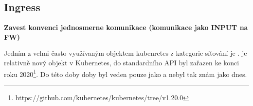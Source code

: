 
\subsection{Ingress}
\textbf{Zavest konvenci jednosmerne komunikace (komunikace jako INPUT na FW)}

Jedním z velmi často využívaným objektem kubenretes z kategorie síťování je .  je relativně nový objekt v Kubernetes, do standardního API byl zařazen ke konci roku 2020\footnote{https://github.com/kubernetes/kubernetes/tree/v1.20.0}. Do této doby doby byl veden pouze jako \cite{kashin_2021_gateway} a nebyl tak znám jako dnes.

